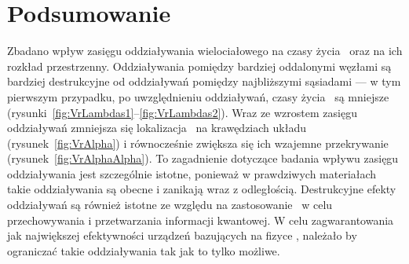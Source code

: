 \ornament

\section*{Podsumowanie}

Zbadano wpływ zasięgu oddziaływania wielociałowego na czasy życia \MZM\ oraz na ich rozkład przestrzenny.
Oddziaływania pomiędzy bardziej oddalonymi węzłami są bardziej destrukcyjne od oddziaływań pomiędzy najbliższymi sąsiadami --- w tym pierwszym przypadku, po uwzględnieniu oddziaływań, czasy życia \MZM\ są mniejsze (rysunki~\ref{fig:VrLambdas1}--\ref{fig:VrLambdas2}).
Wraz ze wzrostem zasięgu oddziaływań zmniejsza się lokalizacja \MZM\ na krawędziach układu (rysunek~\ref{fig:VrAlpha}) i równocześnie zwiększa się ich wzajemne przekrywanie (rysunek~\ref{fig:VrAlphaAlpha}).
To zagadnienie dotyczące badania wpływu zasięgu oddziaływania jest szczególnie istotne, ponieważ w prawdziwych materiałach takie oddziaływania są obecne i zanikają wraz z odległością.
Destrukcyjne efekty oddziaływań są również istotne ze względu na zastosowanie \MZM\ w celu przechowywania i przetwarzania informacji kwantowej.
W celu zagwarantowania jak największej efektywności urządzeń bazujących na fizyce \MZM, należało by ograniczać takie oddziaływania tak jak to tylko możliwe.

\ornament




